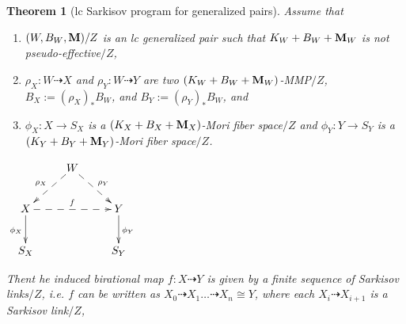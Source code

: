 \documentclass[11pt]{amsart}
\numberwithin{equation}{section}
\newcommand{\Mm}{{\bf{M}}}
\newtheorem{thm}{Theorem}[section]
\theoremstyle{definition}
\theoremstyle{definition}
\theoremstyle{definition}
\begin{document}
\begin{thm}[lc Sarkisov program for generalized pairs]\label{thm: lc Sarkisov program gpair}
Assume that
\begin{enumerate}
    \item $(W,B_W,\Mm)/Z$ is an lc generalized pair such that $K_W+B_W+\Mm_W$ is not pseudo-effective$/Z$,
    \item $\rho_X: W\dashrightarrow X$ and $\rho_Y: W\dashrightarrow Y$ are two $(K_W+B_W+\Mm_W)$-MMP$/Z$, $B_X:=(\rho_X)_*B_W$, and $B_Y:=(\rho_Y)_*B_W$, and
    \item $\phi_X: X\rightarrow S_X$ is a $(K_X+B_X+\Mm_X)$-Mori fiber space$/Z$ and $\phi_Y: Y\rightarrow S_Y$ is a $(K_Y+B_Y+\Mm_Y)$-Mori fiber space$/Z$.
\end{enumerate}
\begin{center}$\xymatrix{
 & W\ar@{-->}[dl]_{\rho_X}\ar@{-->}[dr]^{\rho_Y}& \\
      X \ar@{->}[d]_{\phi_X}\ar@{-->}[rr]^{f}   &  & Y\ar@{->}[d]^{\phi_Y} \\
    S_X & &S_Y }$
\end{center}
Thent he induced birational map $f: X\dashrightarrow Y$ is given by a finite sequence of Sarkisov links$/Z$, i.e. $f$ can be written as $X_0\dashrightarrow X_1\dots\dashrightarrow X_n\cong Y$, where each $X_{i}\dashrightarrow X_{i+1}$ is a Sarkisov link$/Z$,
\end{thm}
\end{document}
